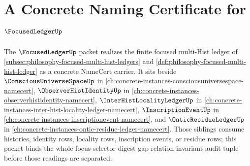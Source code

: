 \chapter{A Concrete Naming Certificate for $\FocusedLedgerUp$}
\label{ch:concrete-instances-focused-ledger-namecert}

The $\FocusedLedgerUp$ packet realizes the finite focused multi-Hist ledger of \autoref{subsec:philosophy-focused-multi-hist-ledgers} and \autoref{def:philosophy-focused-multi-hist-ledger} as a concrete NameCert carrier. It sits beside $\ConsciousUniverseSpaceUp$ in \autoref{ch:concrete-instances-consciousuniversespace-namecert}, $\ObserverHistIdentityUp$ in \autoref{ch:concrete-instances-observerhistidentity-namecert}, $\InterHistLocalityLedgerUp$ in \autoref{ch:concrete-instances-inter-hist-locality-ledger-namecert}, $\InscriptionEventUp$ in \autoref{ch:concrete-instances-inscriptionevent-namecert}, and $\OnticResidueLedgerUp$ in \autoref{ch:concrete-instances-ontic-residue-ledger-namecert}. Those siblings consume histories, identity rows, locality rows, inscription events, or residue rows; this packet binds the whole focus-selector-digest-gap-relation-invariant-audit tuple before those readings are separated.

